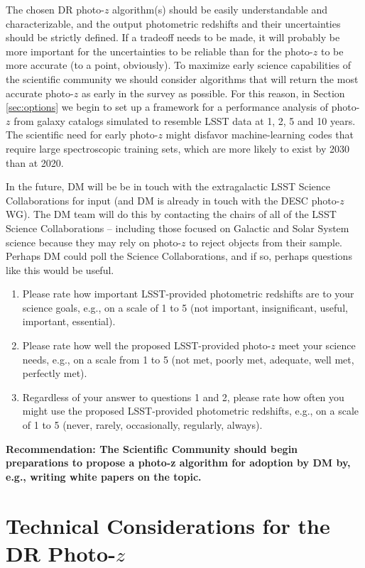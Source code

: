 \documentclass[DM,lsstdraft,toc]{lsstdoc}
\begin{document}
\smallskip
The chosen DR photo-$z$ algorithm(s) should be easily understandable and characterizable, and the output photometric redshifts and their uncertainties should be strictly defined. If a tradeoff needs to be made, it will probably be more important for the uncertainties to be reliable than for the photo-$z$ to be more accurate (to a point, obviously). To maximize early science capabilities of the scientific community we should consider algorithms that will return the most accurate photo-$z$ as early in the survey as possible. For this reason, in Section \ref{sec:options} we begin to set up a framework for a performance analysis of photo-$z$ from galaxy catalogs simulated to resemble LSST data at 1, 2, 5 and 10 years. The scientific need for early photo-$z$ might disfavor machine-learning codes that require large spectroscopic training sets, which are more likely to exist by 2030 than at 2020.

\smallskip
In the future, DM will be be in touch with the extragalactic LSST Science Collaborations for input (and DM is already in touch with the DESC photo-$z$ WG). The DM team will do this by contacting the chairs of all of the LSST Science Collaborations -- including those focused on Galactic and Solar System science because they may rely on photo-$z$ to reject objects from their sample. Perhaps DM could poll the Science Collaborations, and if so, perhaps questions like this would be useful.
\begin{enumerate}
\item Please rate how important LSST-provided photometric redshifts are to your science goals, e.g., on a scale of 1 to 5 (not important, insignificant, useful, important, essential).
\item Please rate how well the proposed LSST-provided photo-$z$ meet your science needs, e.g., on a scale from 1 to 5 (not met, poorly met, adequate, well met, perfectly met).
\item Regardless of your answer to questions 1 and 2, please rate how often you might use the proposed LSST-provided photometric redshifts, e.g., on a scale of 1 to 5 (never, rarely, occasionally, regularly, always).
\end{enumerate}

\textbf{Recommendation: The Scientific Community should begin preparations to propose a photo-z algorithm for adoption by DM by, e.g., writing white papers on the topic.}


\section{Technical Considerations for the DR Photo-$z$}\label{sec:tech}
\end{document}
